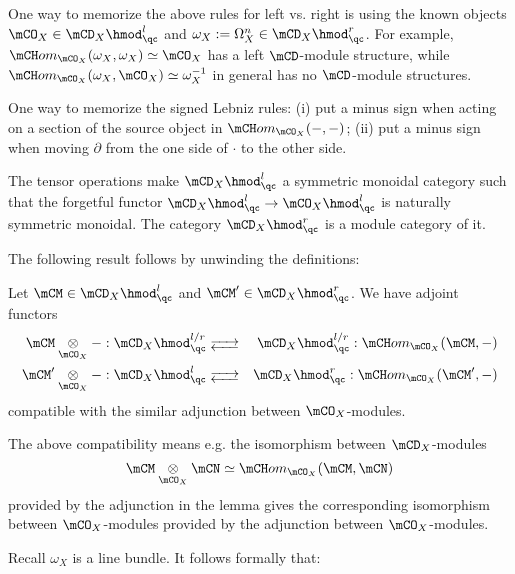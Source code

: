 	\begin{rem}
		One way to memorize the above rules for left vs. right is using the known objects $\mCO_X \in \mCD_X\hmod_\qc^l$ and $\omega_X:=\Omega_X^n \in \mCD_X\hmod_\qc^r$. For example, $\mCH om_{\mCO_X}(\omega_X,\omega_X)\simeq \mCO_X$ has a left $\mCD$-module structure, while $\mCH om_{\mCO_X}(\omega_X,\mCO_X)\simeq \omega_X^{-1}$ in general has no $\mCD$-module structures.
	\end{rem}

	\begin{rem}
		One way to memorize the signed Lebniz rules: (i) put a minus sign when acting on a section of the source object in $\mCH om_{\mCO_X}(-,-)$; (ii) put a minus sign when moving $\partial$ from the one side of $\cdot$ to the other side.
	\end{rem}

	\begin{rem}
		The tensor operations make $\mCD_X\hmod_\qc^l$ a symmetric monoidal category such that the forgetful functor $\mCD_X\hmod_\qc^l \to \mCO_X\hmod_\qc^l$ is naturally symmetric monoidal. The category $\mCD_X\hmod_\qc^r$ is a module category of it.
	\end{rem}

	The following result follows by unwinding the definitions:

	\begin{lem}
		Let $\mCM\in \mCD_X\hmod_\qc^l$ and  $\mCM' \in \mCD_X\hmod_\qc^r$. We have adjoint functors
		\begin{eqnarray*}
			\mCM \ot_{\mCO_X} - : \mCD_X\hmod_\qc^{l/r} &\adj& \mCD_X\hmod_\qc^{l/r} : \mCH om_{\mCO_X}(\mCM,-) \\
			\mCM' \ot_{\mCO_X} - : \mCD_X\hmod_\qc^{l} &\adj& \mCD_X\hmod_\qc^{r} : \mCH om_{\mCO_X}(\mCM',-)
		\end{eqnarray*}
		compatible with the similar adjunction between $\mCO_X$-modules.
	\end{lem}

	\begin{rem}
		The above compatibility means e.g. the isomorphism between $\mCD_X$-modules
		\[
			\mCM \ot_{\mCO_X} \mCN \simeq \mCH om_{\mCO_X}(\mCM,\mCN)
		\]
		provided by the adjunction in the lemma gives the corresponding isomorphism between $\mCO_X$-modules provided by the adjunction between $\mCO_X$-modules. 
	\end{rem}

	Recall $\omega_X$ is a line bundle. It follows formally that:

